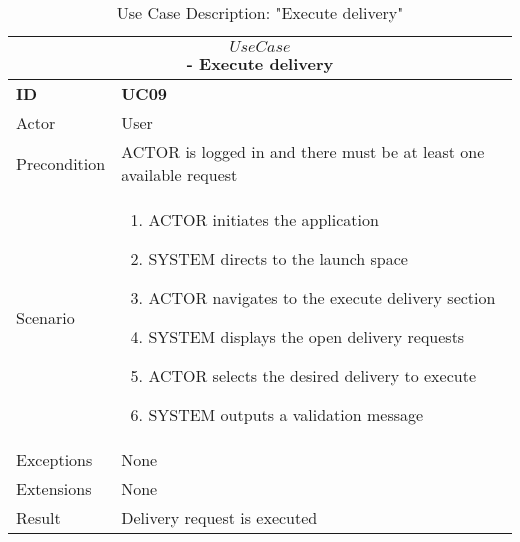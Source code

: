 \begin{center}
    \vspace{5mm}
    \begin{table}[H]
        \begin{tabular}{ |p{2cm}||p{11cm}| }
            \hline
            \multicolumn{2}{|c|}{$$Use Case$$ - Execute delivery} \\ \hline
            \textbf{ID} & \textbf{UC09} \\ \hline
            Actor & User \\ \hline
            Precondition & ACTOR is logged in and there must be at least one available request \\ \hline
            Scenario &
            \begin{enumerate}
                \item ACTOR initiates the application
                \item SYSTEM directs to the launch space
                \item ACTOR navigates to the execute delivery section
                \item SYSTEM displays the open delivery requests
                \item ACTOR selects the desired delivery to execute
                \item SYSTEM outputs a validation message
            \end{enumerate}
            \\ \hline 
            Exceptions & None \\ \hline
            Extensions & None \\ \hline
            Result & Delivery request is executed \\ \hline
        \end{tabular}
        \caption{Use Case Description: "Execute delivery"}
    \end{table}


\end{center}
